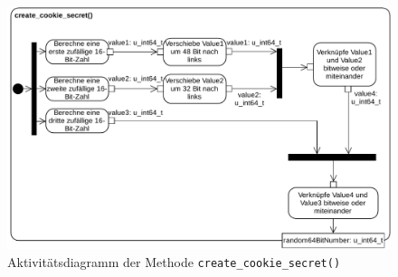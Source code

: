 \documentclass[../review_3.tex]{subfiles}
\begin{document}
\begin{figure}[H]
    \centering
    \includegraphics[width=\linewidth]{img/create_cookie_secret_neu.pdf}
    \caption{Aktivitätsdiagramm der Methode \texttt{create\_cookie\_secret()}}
    \label{createcookiesecret}
\end{figure}
\end{document}
